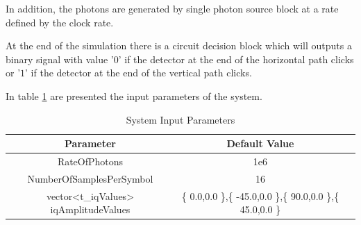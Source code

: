 In addition, the photons are generated by single photon source block at a rate defined by the clock rate.

At the end of the simulation there is a circuit decision block which will outputs a binary signal with value '$0$' if the detector at the end of the horizontal path clicks or '$1$' if the detector at the end of the vertical path clicks.

In table \ref{tb:inputparameters2} are presented the input parameters of the system.


\begin{table}[H]
\centering
\caption{System Input Parameters}
\label{tb:inputparameters2}
\begin{tabular}{|c|c|c|}
\hline
\textbf{Parameter}                      & \textbf{Default Value}                                       \\ \hline
RateOfPhotons                           & 1e6                                                          \\ \hline
NumberOfSamplesPerSymbol                & 16                                                           \\ \hline
vector<t\_iqValues> iqAmplitudeValues   & \{ 0.0,0.0 \},\{ -45.0,0.0 \},\{ 90.0,0.0 \},\{ 45.0,0.0 \}  \\ \hline

\end{tabular}
\end{table}

